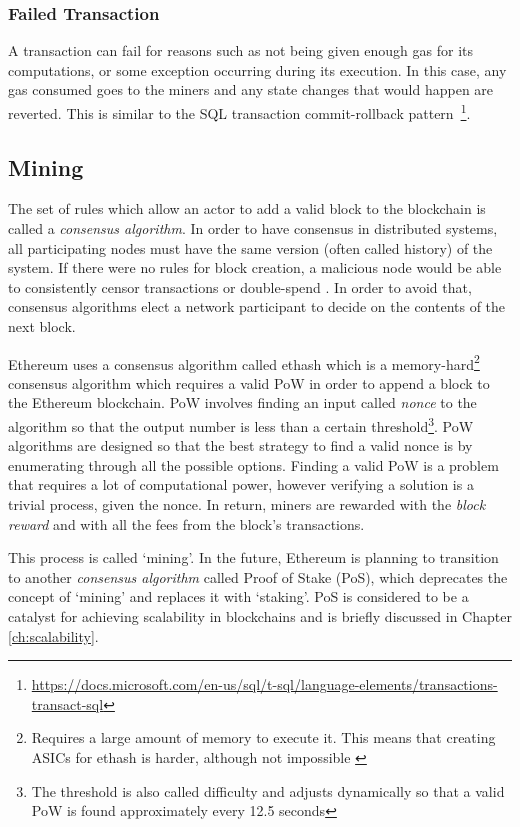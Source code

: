 \subsubsection{Failed Transaction}
A transaction can fail for reasons such as not being given enough gas for its computations, or some exception occurring during its execution. In this case, any gas consumed goes to the miners and any state changes that would happen are reverted. This is similar to the SQL transaction commit-rollback pattern~\footnote{\url{https://docs.microsoft.com/en-us/sql/t-sql/language-elements/transactions-transact-sql}}.



\subsection{Mining}
The set of rules which allow an actor to add a valid block to the blockchain is called a \textit{consensus algorithm}. In order to have consensus in distributed systems, all participating nodes must have the same version (often called history) of the system. If there were no rules for block creation, a malicious node would be able to consistently censor transactions or double-spend \cite{doublespend}. In order to avoid that, consensus algorithms elect a network participant to decide on the contents of the next block. 

Ethereum uses a consensus algorithm called ethash\cite{ethash} which is a memory-hard\footnote{Requires a large amount of memory to execute it. This means that creating ASICs for ethash is harder, although not impossible \cite{asicfork}} consensus algorithm which requires a valid PoW in order to append a block to the Ethereum blockchain. PoW involves finding an input called \textit{nonce} to the algorithm so that the output number is less than a certain threshold\footnote{The threshold is also called difficulty and adjusts dynamically so that a valid PoW is found approximately every 12.5 seconds}. PoW algorithms are designed so that the best strategy to find a valid nonce is by enumerating through all the possible options. Finding a valid PoW is a problem that requires a lot of computational power, however verifying a solution is a trivial process, given the nonce. In return, miners are rewarded with the \textit{block reward} and with all the fees from the block's transactions.

This process is called `mining'. In the future, Ethereum is planning to transition to another \textit{consensus algorithm} called Proof of Stake (PoS), which deprecates the concept of `mining' and replaces it with `staking'. PoS is considered to be a catalyst for achieving scalability in blockchains and is briefly discussed in Chapter \ref{ch:scalability}.

